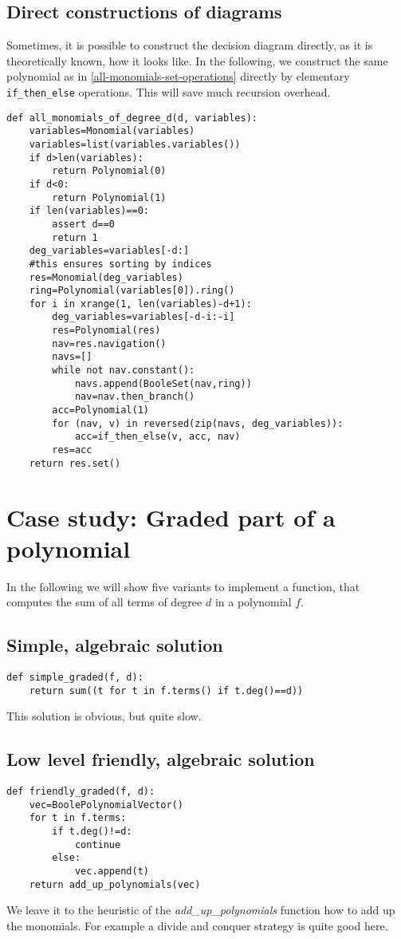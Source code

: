 \documentclass[]{article}
\newcommand{\functionname}[1]{\textit{#1}\xspace}
\begin{document}
\subsection{Direct constructions of diagrams}
Sometimes, it is possible to construct the decision diagram directly, as it is theoretically known, how it looks like.
In the following, we construct the same polynomial as in \ref{all-monomials-set-operations} directly by elementary \lstinline|if_then_else| operations. This will save much recursion overhead.
\begin{lstlisting}
def all_monomials_of_degree_d(d, variables):
    variables=Monomial(variables)
    variables=list(variables.variables())
    if d>len(variables):
        return Polynomial(0)
    if d<0:
        return Polynomial(1)
    if len(variables)==0:
        assert d==0
        return 1
    deg_variables=variables[-d:]
    #this ensures sorting by indices
    res=Monomial(deg_variables)
    ring=Polynomial(variables[0]).ring()
    for i in xrange(1, len(variables)-d+1):
        deg_variables=variables[-d-i:-i]
        res=Polynomial(res)
        nav=res.navigation()
        navs=[]
        while not nav.constant():
            navs.append(BooleSet(nav,ring))
            nav=nav.then_branch()
        acc=Polynomial(1)
        for (nav, v) in reversed(zip(navs, deg_variables)):
            acc=if_then_else(v, acc, nav)
        res=acc
    return res.set()
\end{lstlisting}

\section{Case study: Graded part of a polynomial}
In the following we will show five variants to implement a function, that computes the sum of all terms of degree $d$ in a polynomial $f$.

\subsection{Simple, algebraic solution}
\begin{lstlisting}
def simple_graded(f, d):
    return sum((t for t in f.terms() if t.deg()==d))   
\end{lstlisting}
This solution is obvious, but quite slow.

\subsection{Low level friendly, algebraic solution}
\begin{lstlisting}
def friendly_graded(f, d):
    vec=BoolePolynomialVector()
    for t in f.terms:
        if t.deg()!=d:
            continue
        else:
            vec.append(t)
    return add_up_polynomials(vec)
\end{lstlisting}
We leave it to the heuristic of the \functionname{add\_up\_polynomials} function how to add up the monomials. For example a divide and conquer strategy is quite good here.
\end{document}
